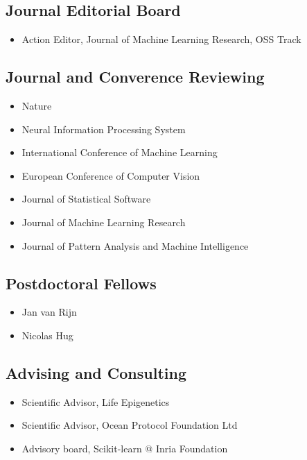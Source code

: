 \documentclass[a4paper,11pt]{article}
\begin{document}
\subsection{Journal Editorial Board}
\begin{itemize}
    \item Action Editor, Journal of Machine Learning Research, OSS Track
\end{itemize}
\subsection{Journal and Converence Reviewing}
\begin{itemize}
    \item Nature
    \item Neural Information Processing System
    \item International Conference of Machine Learning
    \item European Conference of Computer Vision
    \item Journal of Statistical Software
    \item Journal of Machine Learning Research
    \item Journal of Pattern Analysis and Machine Intelligence
\end{itemize}
\subsection{Postdoctoral Fellows}
\begin{itemize}
    \item Jan van Rijn
    \item Nicolas Hug
\end{itemize}
\subsection{Advising and Consulting}
\begin{itemize}
    \item Scientific Advisor, Life Epigenetics
    \item Scientific Advisor, Ocean Protocol Foundation Ltd
    \item Advisory board, Scikit-learn @ Inria Foundation
\end{itemize}
\begin{publications}
\end{publications}
\end{document}

